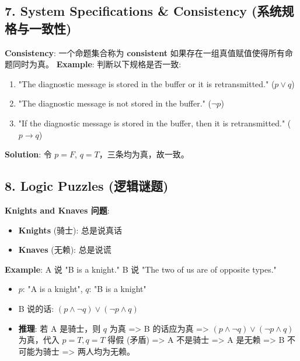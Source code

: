 \documentclass[10pt,a4paper,openany]{ctexbook}
\theoremstyle{definition}
\theoremstyle{remark}
\begin{document}
\vspace{-2pt}

\subsection{7. System Specifications \& Consistency (系统规格与一致性)}

\textbf{Consistency}: 一个命题集合称为 \textbf{consistent} 如果存在一组真值赋值使得所有命题同时为真。
\textbf{Example}: 判断以下规格是否一致:
\begin{enumerate}
\item "The diagnostic message is stored in the buffer or it is retransmitted." ($p \lor q$)
\item "The diagnostic message is not stored in the buffer." ($\neg p$)
\item "If the diagnostic message is stored in the buffer, then it is retransmitted." ($p \to q$)

\end{enumerate}

\textbf{Solution}: 令 $p = F$, $q = T$，三条均为真，故一致。
\vspace{-2pt}

\subsection{8. Logic Puzzles (逻辑谜题)}

\textbf{Knights and Knaves 问题}:
\begin{itemize}
\item \textbf{Knights} (骑士): 总是说真话
\item \textbf{Knaves} (无赖): 总是说谎

\end{itemize}

\textbf{Example}: A 说 "B is a knight." B 说 "The two of us are of opposite types."
\begin{itemize}
\item $p$: "A is a knight", $q$: "B is a knight"
\item B 说的话: $(p \land \neg q) \lor (\neg p \land q)$
\item \textbf{推理}: 若 A 是骑士，则 $q$ 为真 => B 的话应为真 => $(p \land \neg q) \lor (\neg p \land q)$ 为真，代入 $p=T,q=T$ 得假 (矛盾) => A 不是骑士 => A 是无赖 => B 不可能为骑士 => 两人均为无赖。

\end{itemize}

\vspace{-2pt}
\end{document}
